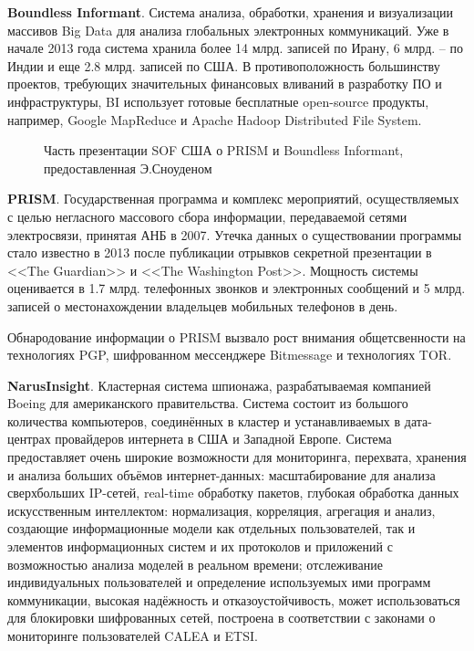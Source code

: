 	\textbf{Boundless Informant}. Система анализа, обработки, хранения и визуализации массивов Big Data для анализа глобальных электронных коммуникаций.  Уже в начале 2013 года система хранила более 14 млрд. записей по Ирану, 6 млрд. --  по Индии и еще 2.8 млрд. записей по США. \cite{BoIn1} %
	В противоположность большинству проектов, требующих значительных финансовых вливаний в разработку ПО и инфраструктуры, BI использует готовые бесплатные open-source продукты, например, Google MapReduce и  Apache Hadoop Distributed File System.
		\begin{figure*}[h!]
		\caption{ Часть презентации SOF США о PRISM и Boundless Informant, предоставленная Э.Сноуденом}
	\end{figure*} 
	\textbf{PRISM}.  Государственная программа и 	комплекс мероприятий, осуществляемых с целью  негласного массового  сбора информации, передаваемой   сетями электросвязи, принятая АНБ в 2007. Утечка данных о существовании программы стало известно в 2013 после публикации отрывков секретной презентации в   <<The Guardian>> и <<The Washington Post>>. Мощность системы оценивается в 1.7 млрд. телефонных звонков и электронных сообщений и 5 млрд. записей о местонахождении владельцев мобильных телефонов в день. \cite{PRISM1} \cite{PRISM2} %
	
	Обнародование информации о PRISM вызвало рост внимания общетсвенности на технологиях PGP, шифрованном мессенджере   Bitmessage и технологиях TOR.  \cite{PRISM3} %
	
	
	\textbf{NarusInsight}. Кластерная система шпионажа, разрабатываемая компанией Boeing для американского правительства. \cite{Narus} %
	Система состоит из большого количества компьютеров, соединённых в кластер и устанавливаемых в дата-центрах провайдеров интернета в США и Западной Европе. Система предоставляет очень широкие возможности для мониторинга, перехвата, хранения и анализа больших объёмов интернет-данных: масштабирование для анализа  сверхбольших IP-сетей, real-time обработку пакетов,  глубокая обработка данных искусственным интеллектом: нормализация, корреляция, агрегация и анализ, создающие информационные модели как отдельных пользователей, так и элементов информационных систем и их протоколов и приложений с возможностью анализа моделей в реальном времени; отслеживание индивидуальных пользователей и определение используемых  ими программ коммуникации, высокая надёжность и отказоустойчивость, может использоваться для блокировки шифрованных сетей,  построена в соответствии с законами о мониторинге пользователей CALEA и ETSI.
	
